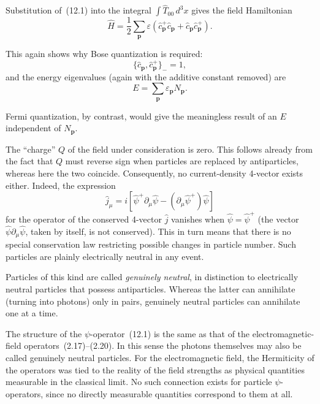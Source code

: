 Substitution of~(12.1) into the integral $\int\widehat T_{00}\,d^3x$ gives the field Hamiltonian
\begin{equation}
\widehat H=\frac{1}{2}\sum_{\mathbf p}\varepsilon
\left(\widehat c^+_{\mathbf p}\widehat c_{\mathbf p}
+\widehat c_{\mathbf p}\widehat c^+_{\mathbf p}\right).
\tag{12.5}
\end{equation}

This again shows why Bose quantization is required:
\begin{equation}
\{\widehat c_{\mathbf p},\widehat c^+_{\mathbf p}\}_{-}=1,
\tag{12.6}
\end{equation}
and the energy eigenvalues (again with the additive constant removed) are
\begin{equation}
E=\sum_{\mathbf p}\varepsilon_{\mathbf p}N_{\mathbf p}.
\tag{12.7}
\end{equation}

Fermi quantization, by contrast, would give the meaningless result of an $E$ independent of $N_{\mathbf p}$.

The ``charge'' $Q$ of the field under consideration is zero. This follows already from the fact that $Q$ must reverse sign when particles are replaced by antiparticles, whereas here the two coincide. Consequently, no current-density 4-vector exists either. Indeed, the expression
\begin{equation}
\widehat j_\mu=i\left[\widehat\psi^+\partial_\mu\widehat\psi
-(\partial_\mu\widehat\psi^+)\widehat\psi\right]
\tag{12.8}
\end{equation}
for the operator of the conserved 4-vector $\widehat j$ vanishes when $\widehat\psi=\widehat\psi^+$ (the vector $\widehat\psi\partial_\mu\widehat\psi$, taken by itself, is not conserved). This in turn means that there is no special conservation law restricting possible changes in particle number. Such particles are plainly electrically neutral in any event.

Particles of this kind are called \emph{genuinely neutral}, in distinction to electrically neutral particles that possess antiparticles. Whereas the latter can annihilate (turning into photons) only in pairs, genuinely neutral particles can annihilate one at a time.

The structure of the $\psi$-operator~(12.1) is the same as that of the electromagnetic-field operators~(2.17)--(2.20). In this sense the photons themselves may also be called genuinely neutral particles. For the electromagnetic field, the Hermiticity of the operators was tied to the reality of the field strengths as physical quantities measurable in the classical limit. No such connection exists for particle $\psi$-operators, since no directly measurable quantities correspond to them at all.

